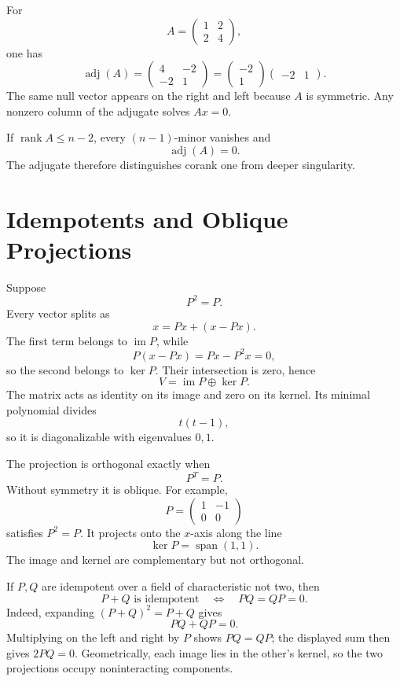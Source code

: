 For
\[
  A=
  \begin{pmatrix}
    1&2\\
    2&4
  \end{pmatrix},
\]
one has
\[
  \operatorname{adj}(A)
  =
  \begin{pmatrix}
    4&-2\\
    -2&1
  \end{pmatrix}
  =
  \begin{pmatrix}-2\\1\end{pmatrix}
  \begin{pmatrix}-2&1\end{pmatrix}.
\]
The same null vector appears on the right and left because \(A\) is symmetric.  Any nonzero column of the adjugate solves \(Ax=0\).

If \(\operatorname{rank}A\le n-2\), every \((n-1)\)-minor vanishes and
\[
  \operatorname{adj}(A)=0.
\]
The adjugate therefore distinguishes corank one from deeper singularity.

\section{Idempotents and Oblique Projections}

Suppose
\[
  P^2=P.
\]
Every vector splits as
\[
  x=Px+(x-Px).
\]
The first term belongs to \(\operatorname{im}P\), while
\[
  P(x-Px)=Px-P^2x=0,
\]
so the second belongs to \(\ker P\).  Their intersection is zero, hence
\[
  V=\operatorname{im}P\oplus\ker P.
\]
The matrix acts as identity on its image and zero on its kernel.  Its minimal polynomial divides
\[
  t(t-1),
\]
so it is diagonalizable with eigenvalues \(0,1\).

The projection is orthogonal exactly when
\[
  P^T=P.
\]
Without symmetry it is oblique.  For example,
\[
  P=
  \begin{pmatrix}
    1&-1\\
    0&0
  \end{pmatrix}
\]
satisfies \(P^2=P\).  It projects onto the \(x\)-axis along the line
\[
  \ker P=\operatorname{span}(1,1).
\]
The image and kernel are complementary but not orthogonal.

If \(P,Q\) are idempotent over a field of characteristic not two, then
\[
  P+Q\text{ is idempotent}
  \quad\Longleftrightarrow\quad
  PQ=QP=0.
\]
Indeed, expanding \((P+Q)^2=P+Q\) gives
\[
  PQ+QP=0.
\]
Multiplying on the left and right by \(P\) shows \(PQ=QP\); the displayed sum then gives \(2PQ=0\).  Geometrically, each image lies in the other's kernel, so the two projections occupy noninteracting components.

